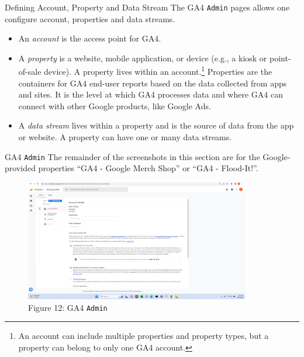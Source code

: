 \documentclass[pdf]{beamer}
\theoremstyle{remark}
\theoremstyle{definition}
\begin{document}
\begin{frame}[t]{Defining Account, Property and Data Stream}
The GA4 \texttt{Admin} pages allows one configure account, properties and data streams.\\
\vspace{1.5ex}
\begin{itemize}
\item An \textit{account} is the access point for GA4. 
\item A \textit{property} is a website, mobile application, or device (e.g., a kiosk or point-of-sale device).  A property lives within an account.\footnote{An account can include multiple properties and property types, but a property can belong to only one GA4 account.} Properties are the containers for GA4 end-user reports based on the data collected from apps and sites. It is the level at which GA4 processes data and where GA4 can connect with other Google products, like Google Ads.
\item A \textit{data stream} lives within a property and is the source of data from the app or website. A property can have one or many data streams.
\end{itemize}
\end{frame}

\begin{frame}[t]{GA4 \texttt{Admin}}
The remainder of the screenshots in this section are for the Google-provided properties ``GA4 - Google Merch Shop'' or ``GA4 - Flood-It!''. 
\begin{figure}[htbp]
  \captionsetup{justification=centering}
  \includegraphics[height=5.3cm, trim=1.5cm 0.0cm 2.0cm 0.0cm width=5.6cm]{Images/GA4_5_091923_Admin.png}
  \caption{Figure {\color{franklinblue} 12}: GA4 \texttt{Admin}}
\end{figure}
\end{frame}
\end{document}
